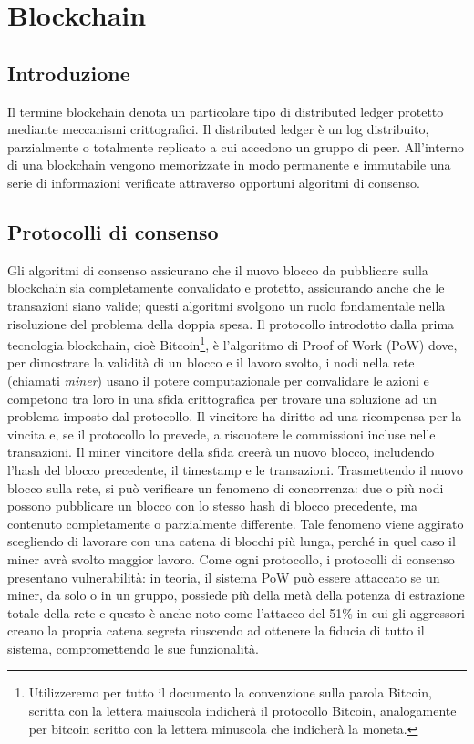 \chapter{Blockchain}
\label{chap:blockchain}

\section{Introduzione}
\label{sec:introduzione}

Il termine blockchain denota un particolare tipo di distributed ledger protetto mediante meccanismi crittografici.
Il distributed ledger è un log distribuito, parzialmente o totalmente replicato a cui accedono un gruppo di peer.
All’interno di una blockchain vengono memorizzate in modo permanente e immutabile una serie di informazioni verificate attraverso opportuni algoritmi di consenso.


\section{Protocolli di consenso}
\label{sec:protocolloDiConsenso}

Gli algoritmi di consenso assicurano che il nuovo blocco da pubblicare sulla blockchain sia completamente convalidato e protetto, assicurando anche che le transazioni siano valide; questi algoritmi svolgono un ruolo fondamentale nella risoluzione del problema della doppia spesa.
Il protocollo introdotto dalla prima tecnologia blockchain, cioè Bitcoin\footnote{Utilizzeremo per tutto il documento la convenzione sulla parola Bitcoin, scritta con la lettera maiuscola indicherà il protocollo Bitcoin, analogamente per bitcoin scritto con la lettera minuscola che indicherà la moneta.}, è l’algoritmo di  Proof of Work (PoW) dove, per dimostrare la validità di un blocco e il lavoro svolto, i nodi nella rete (chiamati {\it miner\/}) usano il potere computazionale per convalidare le azioni e competono tra loro in una sfida crittografica per trovare una soluzione ad un problema imposto dal protocollo.
Il vincitore ha diritto ad una ricompensa per la vincita e, se il protocollo lo prevede, a riscuotere le commissioni incluse nelle transazioni.
Il miner vincitore della sfida creerà un nuovo blocco, includendo l’hash del blocco precedente, il timestamp e le transazioni. \newline
Trasmettendo il nuovo blocco sulla rete, si può verificare un fenomeno di concorrenza: due o più nodi possono pubblicare un blocco con lo stesso hash di blocco precedente, ma contenuto completamente o parzialmente differente. Tale fenomeno viene aggirato scegliendo di lavorare con una catena di blocchi più lunga, perché in quel caso il miner avrà svolto maggior lavoro. \newline
Come ogni protocollo, i protocolli di consenso presentano vulnerabilità: in teoria, il sistema PoW può essere attaccato se un miner, da solo o in un gruppo, possiede più della metà della potenza di estrazione totale della rete e questo è anche noto come l'attacco del 51\% in cui gli aggressori creano la propria catena segreta riuscendo ad ottenere la fiducia di tutto il sistema, compromettendo le sue funzionalità.


